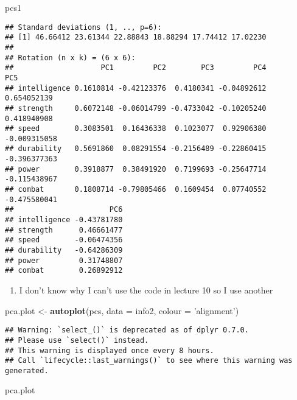 \documentclass[]{article}
\newenvironment{Shaded}{\begin{snugshade}}{\end{snugshade}}
\newcommand{\DataTypeTok}[1]{\textcolor[rgb]{0.13,0.29,0.53}{#1}}
\newcommand{\KeywordTok}[1]{\textcolor[rgb]{0.13,0.29,0.53}{\textbf{#1}}}
\newcommand{\NormalTok}[1]{#1}
\newcommand{\StringTok}[1]{\textcolor[rgb]{0.31,0.60,0.02}{#1}}
\providecommand{\tightlist}{%
  \setlength{\itemsep}{0pt}\setlength{\parskip}{0pt}}
\begin{document}
\begin{Shaded}
\begin{Highlighting}[]
\NormalTok{pcs1}
\end{Highlighting}
\end{Shaded}

\begin{verbatim}
## Standard deviations (1, .., p=6):
## [1] 46.66412 23.61344 22.88843 18.88294 17.74412 17.02230
## 
## Rotation (n x k) = (6 x 6):
##                    PC1         PC2        PC3         PC4          PC5
## intelligence 0.1610814 -0.42123376  0.4180341 -0.04892612  0.654052139
## strength     0.6072148 -0.06014799 -0.4733042 -0.10205240  0.418940908
## speed        0.3083501  0.16436338  0.1023077  0.92906380 -0.009315058
## durability   0.5691860  0.08291554 -0.2156489 -0.22860415 -0.396377363
## power        0.3918877  0.38491920  0.7199693 -0.25647714 -0.115438967
## combat       0.1808714 -0.79805466  0.1609454  0.07740552 -0.475580041
##                      PC6
## intelligence -0.43781780
## strength      0.46661477
## speed        -0.06474356
## durability   -0.64286309
## power         0.31748807
## combat        0.26892912
\end{verbatim}

\begin{enumerate}
\def\labelenumi{\arabic{enumi}.}
\setcounter{enumi}{5}
\tightlist
\item
  I don't know why I can't use the code in lecture 10 so I use another
\end{enumerate}

\begin{Shaded}
\begin{Highlighting}[]
\NormalTok{pca.plot <-}\StringTok{ }\KeywordTok{autoplot}\NormalTok{(pcs, }\DataTypeTok{data =}\NormalTok{ info2, }\DataTypeTok{colour =} \StringTok{'alignment'}\NormalTok{)}
\end{Highlighting}
\end{Shaded}

\begin{verbatim}
## Warning: `select_()` is deprecated as of dplyr 0.7.0.
## Please use `select()` instead.
## This warning is displayed once every 8 hours.
## Call `lifecycle::last_warnings()` to see where this warning was generated.
\end{verbatim}

\begin{Shaded}
\begin{Highlighting}[]
\NormalTok{pca.plot}
\end{Highlighting}
\end{Shaded}
\end{document}
